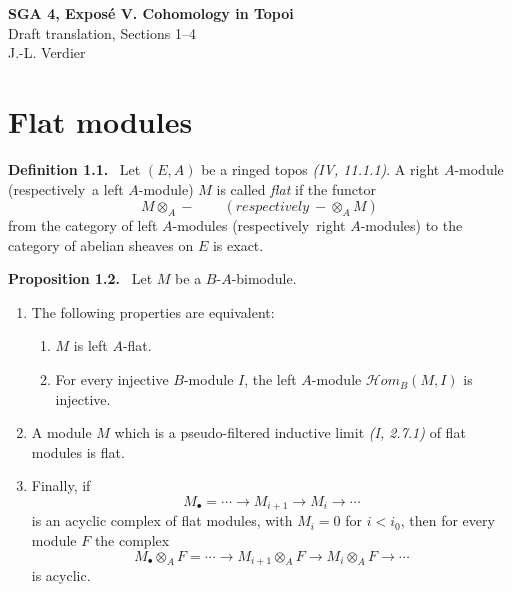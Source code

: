\documentclass[11pt]{article}
\newcommand{\resp}{respectively}
\newcommand{\Hhom}{\mathcal{H}om}
\newenvironment{statement}[1]{\par\medskip\noindent\textbf{#1.}\ }{\par\medskip}
\begin{document}
\begin{center}
{\Large \textbf{SGA 4, Expos\'e V. Cohomology in Topoi}}\\[0.35em]
{\large Draft translation, Sections 1--4}\\[0.35em]
J.-L. Verdier
\end{center}

\bigskip


\section{Flat modules}

\begin{statement}{Definition 1.1}
Let $(E,A)$ be a ringed topos \emph{(IV, 11.1.1)}. A right $A$-module (\resp\ a left $A$-module) $M$ is called \emph{flat} if the functor
\[
M\otimes_A - \qquad (\resp\ -\otimes_A M)
\]
from the category of left $A$-modules (\resp\ right $A$-modules) to the category of abelian sheaves on $E$ is exact.
\end{statement}

\begin{statement}{Proposition 1.2}
Let $M$ be a $B$-$A$-bimodule.
\begin{enumerate}[label=\arabic*)]
\item The following properties are equivalent:
\begin{enumerate}[label=(\roman*)]
\item $M$ is left $A$-flat.
\item For every injective $B$-module $I$, the left $A$-module $\Hhom_B(M,I)$ is injective.
\end{enumerate}
\item A module $M$ which is a pseudo-filtered inductive limit \emph{(I, 2.7.1)} of flat modules is flat.
\item Finally, if
\[
M_\bullet=\cdots\longrightarrow M_{i+1}\longrightarrow M_i\longrightarrow\cdots
\]
is an acyclic complex of flat modules, with $M_i=0$ for $i<i_0$, then for every module $F$ the complex
\[
M_\bullet\otimes_A F=\cdots\longrightarrow M_{i+1}\otimes_A F
   \longrightarrow M_i\otimes_A F\longrightarrow\cdots
\]
is acyclic.
\end{enumerate}
\end{statement}
\end{document}
